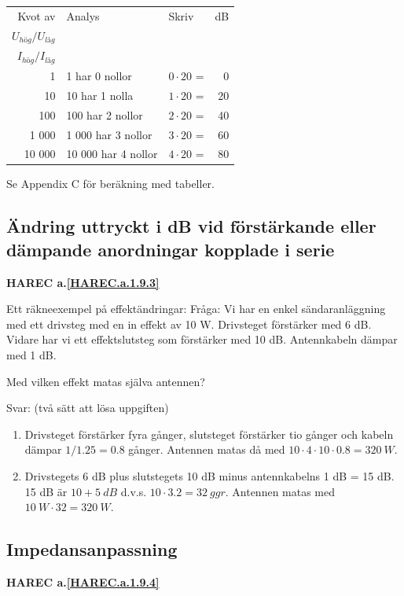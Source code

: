 \begin{tabular}{rllr}
Kvot av & Analys             & Skriv            & dB \\
\(U_{hög}/U_{låg}\) &          &                  &    \\
\(I_{hög}/I_{låg}\) &          &                  &    \\
     1 & 1 har 0 nollor      & \(0 \cdot 20\) = &  0 \\
    10 & 10 har 1 nolla      & \(1 \cdot 20\) = & 20 \\
   100 & 100 har 2 nollor    & \(2 \cdot 20\) = & 40 \\
 1 000 &  1 000 har 3 nollor & \(3 \cdot 20\) = & 60 \\
10 000 & 10 000 har 4 nollor & \(4 \cdot 20\) = & 80
\end{tabular}

Se Appendix C för beräkning med tabeller.

\subsection{Ändring uttryckt i dB vid förstärkande eller dämpande anordningar kopplade i serie}
\textbf{HAREC a.\ref{HAREC.a.1.9.3}\label{myHAREC.a.1.9.3}}

Ett räkneexempel på effektändringar:
Fråga:
Vi har en enkel sändaranläggning med ett drivsteg med en in effekt av 10 W.
Drivsteget förstärker med 6 dB. Vidare har vi ett effektslutsteg som förstärker
med 10 dB. Antennkabeln dämpar med 1 dB.

Med vilken effekt matas själva antennen?

Svar: (två sätt att lösa uppgiften)
\begin{enumerate}
\item Drivsteget förstärker fyra gånger, slutsteget förstärker tio gånger och
kabeln dämpar \(1/1.25 = 0.8\) gånger. Antennen matas då med
\(10 \cdot 4 \cdot 10 \cdot 0.8 = 320\ W\).
\item Drivstegets 6 dB plus slutstegets 10 dB minus antennkabelns 1 dB = 15 dB.
15 dB är \(10 + 5\ dB\) d.v.s. \(10 \cdot 3.2 = 32\ ggr\). Antennen matas med
\(10\ W \cdot 32 = 320\ W\).
\end{enumerate}

\subsection{Impedansanpassning}
\textbf{HAREC a.\ref{HAREC.a.1.9.4}\label{myHAREC.a.1.9.4}}

